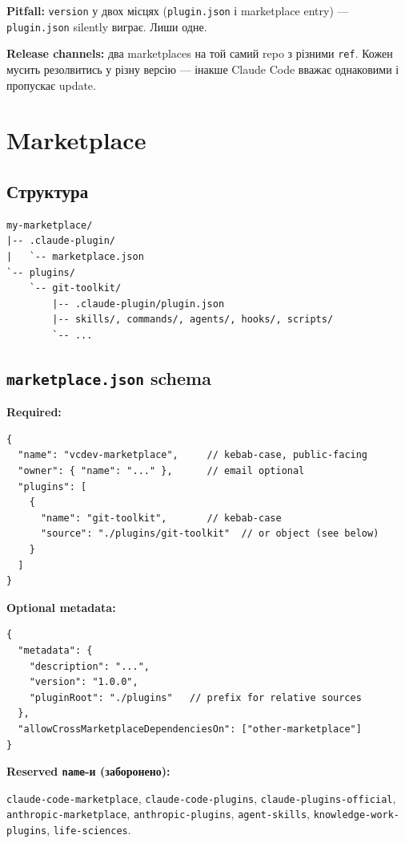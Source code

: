 \documentclass[11pt,a4paper]{article}
\begin{document}
\textbf{Pitfall:} \texttt{version} у двох місцях (\texttt{plugin.json} і marketplace entry) --- \texttt{plugin.json} silently виграє. Лиши одне.

\textbf{Release channels:} два marketplaces на той самий repo з різними \texttt{ref}. Кожен мусить резолвитись у різну версію --- інакше Claude Code вважає однаковими і пропускає update.

\section{Marketplace}

\subsection{Структура}

\begin{lstlisting}
my-marketplace/
|-- .claude-plugin/
|   `-- marketplace.json
`-- plugins/
    `-- git-toolkit/
        |-- .claude-plugin/plugin.json
        |-- skills/, commands/, agents/, hooks/, scripts/
        `-- ...
\end{lstlisting}

\subsection{\texttt{marketplace.json} schema}

\textbf{Required:}

\begin{lstlisting}
{
  "name": "vcdev-marketplace",     // kebab-case, public-facing
  "owner": { "name": "..." },      // email optional
  "plugins": [
    {
      "name": "git-toolkit",       // kebab-case
      "source": "./plugins/git-toolkit"  // or object (see below)
    }
  ]
}
\end{lstlisting}

\textbf{Optional metadata:}

\begin{lstlisting}
{
  "metadata": {
    "description": "...",
    "version": "1.0.0",
    "pluginRoot": "./plugins"   // prefix for relative sources
  },
  "allowCrossMarketplaceDependenciesOn": ["other-marketplace"]
}
\end{lstlisting}

\textbf{Reserved \texttt{name}-и (заборонено):}

\texttt{claude-code-marketplace}, \texttt{claude-code-plugins}, \texttt{claude-plugins-official}, \texttt{anthropic-marketplace}, \texttt{anthropic-plugins}, \texttt{agent-skills}, \texttt{knowledge-work-plugins}, \texttt{life-sciences}.
\end{document}
